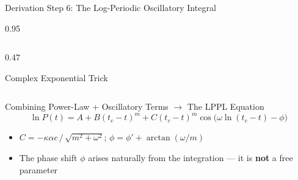 \documentclass[9pt, aspectratio=169, t]{beamer}
\begin{document}
\begin{frame}{Derivation Step 6: The Log-Periodic Oscillatory Integral}
\begin{cminipage}{0.95\textwidth}
{\begin{columns}[T]
\begin{column}{0.47\textwidth}
\begin{alertblock}{Complex Exponential Trick}
            \end{alertblock}
        \end{column}
    \end{columns}
    \vspace{-1mm}
    \begin{exampleblock}{Combining Power-Law + Oscillatory Terms $\longrightarrow$ The LPPL Equation}
        \vspace{-1mm}
        $$\ln P(t) = A + B(t_c{-}t)^m + C(t_c{-}t)^m\cos\bigl(\omega\ln(t_c{-}t) - \phi\bigr)$$
        \vspace{-3mm}
        \begin{itemize}\setlength{\itemsep}{0pt}
            \item $C = -\kappa\alpha c\,/\,\sqrt{m^2 + \omega^2}$; \quad $\phi = \phi' + \arctan(\omega/m)$
            \item The phase shift $\phi$ arises naturally from the integration --- it is \textbf{not} a free parameter
        \end{itemize}
    \end{exampleblock}
    }
    \end{cminipage}
\end{frame}
\end{document}
